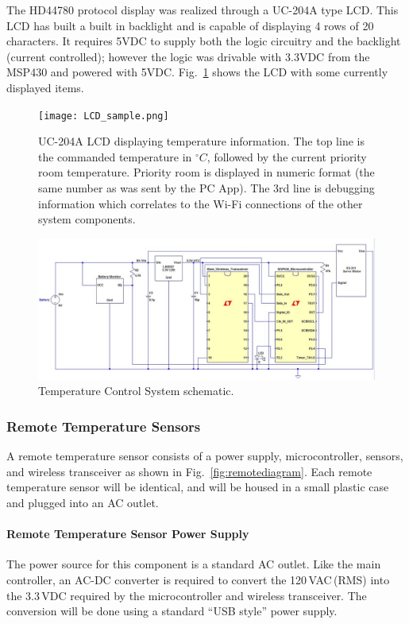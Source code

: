 The HD44780 protocol display was realized through a UC-204A type LCD.  This LCD has built a built in backlight and is capable of displaying 4 rows of 20 characters.  It requires 5VDC to supply both the logic circuitry and the backlight (current controlled); however the logic was drivable with 3.3VDC from the MSP430 and powered with 5VDC. Fig.~\ref{fig:lcd_sample} shows the LCD with some currently displayed items.

\begin{figure}
\centering
\texttt{[image: LCD\_sample.png]}
\caption{UC-204A LCD displaying temperature information.  The top line is the commanded temperature in $^\circ C$, followed by the current priority room temperature.  Priority room is displayed in numeric format (the same number as was sent by the PC App).  The 3rd line is debugging information which correlates to the Wi-Fi connections of the other system components. }
\label{fig:lcd_sample}
\end{figure}




\begin{figure} [htb]
\centering
\includegraphics[width=.99\textwidth]{Temperature_Sensor.JPG}
\caption{Temperature Control System schematic.}
\label{fig:Temperature_System}
\end{figure}


\subsubsection{Remote Temperature Sensors}
A remote temperature sensor consists of a power supply, microcontroller, sensors, and wireless transceiver as shown in Fig.~\ref{fig:remotediagram}.  Each remote temperature sensor will be identical, and will be housed in a small plastic case and plugged into an AC outlet.
\paragraph{Remote Temperature Sensor Power Supply}
The power source for this component is a standard AC outlet.  Like the main controller, an AC-DC converter is required to convert the 120\,VAC\,(RMS) into the 3.3\,VDC required by the microcontroller and wireless transceiver.  The conversion will be done using a standard ``USB style'' power supply.
